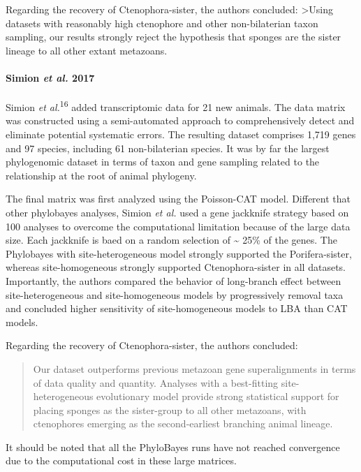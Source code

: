 \documentclass[]{article}
\let\oldparagraph\paragraph
\renewcommand{\paragraph}[1]{\oldparagraph{#1}\mbox{}}
\begin{document}
Regarding the recovery of Ctenophora-sister, the authors concluded:
\textgreater{}Using datasets with reasonably high ctenophore and other
non-bilaterian taxon sampling, our results strongly reject the
hypothesis that sponges are the sister lineage to all other extant
metazoans.

\hypertarget{simion-et-al.-2017}{%
\paragraph{\texorpdfstring{Simion \emph{et al.}
2017}{Simion et al. 2017}}\label{simion-et-al.-2017}}

Simion \emph{et al.}\textsuperscript{16} added transcriptomic data for
21 new animals. The data matrix was constructed using a semi-automated
approach to comprehensively detect and eliminate potential systematic
errors. The resulting dataset comprises 1,719 genes and 97 species,
including 61 non-bilaterian species. It was by far the largest
phylogenomic dataset in terms of taxon and gene sampling related to the
relationship at the root of animal phylogeny.

The final matrix was first analyzed using the Poisson-CAT model.
Different that other phylobayes analyses, Simion \emph{et al.} used a
gene jackknife strategy based on 100 analyses to overcome the
computational limitation because of the large data size. Each jackknife
is baed on a random selection of \textasciitilde{} 25\% of the genes.
The Phylobayes with site-heterogeneous model strongly supported the
Porifera-sister, whereas site-homogeneous strongly supported
Ctenophora-sister in all datasets. Importantly, the authors compared the
behavior of long-branch effect between site-heterogeneous and
site-homogeneous models by progressively removal taxa and concluded
higher sensitivity of site-homogeneous models to LBA than CAT models.

Regarding the recovery of Ctenophora-sister, the authors concluded:

\begin{quote}
Our dataset outperforms previous metazoan gene superalignments in terms
of data quality and quantity. Analyses with a best-fitting
site-heterogeneous evolutionary model provide strong statistical support
for placing sponges as the sister-group to all other metazoans, with
ctenophores emerging as the second-earliest branching animal lineage.
\end{quote}

It should be noted that all the PhyloBayes runs have not reached
convergence due to the computational cost in these large matrices.
\end{document}
